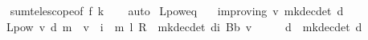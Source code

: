 \begin{isabellebody}
%
\isadelimproof
\ \ %
\endisadelimproof
%
\isatagproof
{}\isamarkupfalse%
\ sum{\isacharunderscore}{\kern0pt}telescope{\isacharbrackleft}{\kern0pt}of\ {\isachardoublequoteopen}{\isacharminus}{\kern0pt}f{\isachardoublequoteclose}\ k{\isacharbrackright}{\kern0pt}\isanewline
\ \ \isamarkupfalse%
\ auto%
\endisatagproof
{\isafoldproof}%
%
\isadelimproof
\isanewline
%
\endisadelimproof
\isanewline
\isanewline
{}\isamarkupfalse%
\ L{\isacharunderscore}{\kern0pt}pow{\isacharunderscore}{\kern0pt}eq{\isacharcolon}{\kern0pt}\isanewline
\ \ \ {\isachardoublequoteopen}{\isasymnu}{\isacharunderscore}{\kern0pt}improving\ v\ {\isacharparenleft}{\kern0pt}mk{\isacharunderscore}{\kern0pt}dec{\isacharunderscore}{\kern0pt}det\ d{\isacharparenright}{\kern0pt}{\isachardoublequoteclose}\isanewline
\ \ \ {\isachardoublequoteopen}L{\isacharunderscore}{\kern0pt}pow\ v\ d\ m\ {\isacharequal}{\kern0pt}\ v\ {\isacharplus}{\kern0pt}\ {\isacharparenleft}{\kern0pt}{\isasymSum}i\ {\isasymle}\ m{\isachardot}{\kern0pt}\ {\isacharparenleft}{\kern0pt}{\isacharparenleft}{\kern0pt}l\ {\isacharasterisk}{\kern0pt}\isactrlsub R\ {\isasymP}\ {\isacharparenleft}{\kern0pt}mk{\isacharunderscore}{\kern0pt}dec{\isacharunderscore}{\kern0pt}det\ d{\isacharparenright}{\kern0pt}{\isacharparenright}{\kern0pt}{\isacharcircum}{\kern0pt}{\isacharcircum}{\kern0pt}i{\isacharparenright}{\kern0pt}{\isacharparenright}{\kern0pt}\ {\isacharparenleft}{\kern0pt}B\isactrlsub b\ v{\isacharparenright}{\kern0pt}{\isachardoublequoteclose}\isanewline
%
\isadelimproof
%
\endisadelimproof
%
\isatagproof
{}\isamarkupfalse%
\ {\isacharminus}{\kern0pt}\isanewline
\ \ \isamarkupfalse%
\ {\isacharquery}{\kern0pt}d\ {\isacharequal}{\kern0pt}\ {\isachardoublequoteopen}{\isacharparenleft}{\kern0pt}mk{\isacharunderscore}{\kern0pt}dec{\isacharunderscore}{\kern0pt}det\ d{\isacharparenright}{\kern0pt}{\isachardoublequoteclose}\isanewline
\ \ \isamarkupfalse%

\end{isabellebody}
